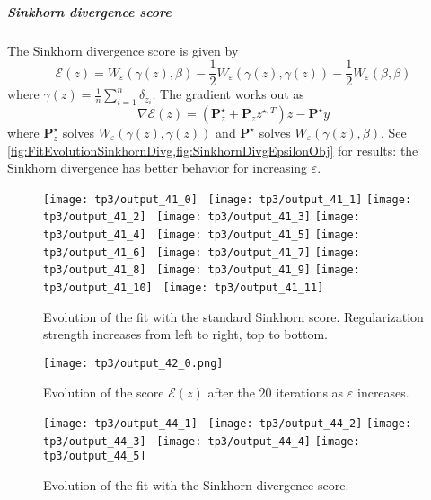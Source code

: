 \documentclass{article}
\newcommand{\bfP}{\mathbf{P}}
\newcommand{\calE}{\mathcal{E}}
\renewcommand{\epsilon}{\varepsilon}
\numberwithin{equation}{section}
\theoremstyle{definition}
\begin{document}
\subparagraph{Sinkhorn divergence score} The Sinkhorn divergence score is given by
\[
	\calE(z) = W_\epsilon\left(\gamma(z), \beta\right) - \frac{1}{2}W_\epsilon(\gamma(z), \gamma(z))
	-\frac{1}{2}W_\epsilon(\beta, \beta)
\]
where $\gamma(z) = \frac{1}{n}\sum_{i=1}^n \delta_{z_i}$. The gradient works out as
\[
	\nabla\calE(z) = (\bfP_z^\star+\bfP_zz^{\star,T})z - \bfP^\star y
\]
where $\bfP_z^\star$ solves $W_\epsilon(\gamma(z),\gamma(z))$ and $\bfP^\star$ solves $W_\epsilon(\gamma(z),\beta)$. See \cref{fig:FitEvolutionSinkhornDivg,fig:SinkhornDivgEpsilonObj} for results: the Sinkhorn divergence has better behavior for increasing $\epsilon$.

\begin{figure}[!h]
	\centering
	\texttt{[image: tp3/output\_41\_0]}~
	\texttt{[image: tp3/output\_41\_1]}
	\texttt{[image: tp3/output\_41\_2]}~
	\texttt{[image: tp3/output\_41\_3]}
	\texttt{[image: tp3/output\_41\_4]}~
	\texttt{[image: tp3/output\_41\_5]}
	\texttt{[image: tp3/output\_41\_6]}~
	\texttt{[image: tp3/output\_41\_7]}
	\texttt{[image: tp3/output\_41\_8]}~
	\texttt{[image: tp3/output\_41\_9]}
	\texttt{[image: tp3/output\_41\_10]}~
	\texttt{[image: tp3/output\_41\_11]}
	\caption{Evolution of the fit with the standard Sinkhorn score. Regularization strength increases from left to right, top to bottom.}
	\label{fig:FitEvolutionSinkhornScore}
\end{figure}

\begin{figure}[!h]
	\centering
	\texttt{[image: tp3/output\_42\_0.png]}
	\caption{Evolution of the score $\calE(z)$ after the $20$ iterations as $\epsilon$ increases.}\label{fig:SinkhornScoreEpsilon}
\end{figure}

\begin{figure}[!h]
	\centering
	\texttt{[image: tp3/output\_44\_1]}~
	\texttt{[image: tp3/output\_44\_2]}
	\texttt{[image: tp3/output\_44\_3]}~
	\texttt{[image: tp3/output\_44\_4]}
	\texttt{[image: tp3/output\_44\_5]}
	\caption{Evolution of the fit with the Sinkhorn divergence score.}
	\label{fig:FitEvolutionSinkhornDivg}
\end{figure}
\end{document}
